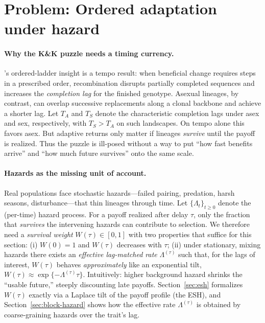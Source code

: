 \documentclass[11pt]{article}
\theoremstyle{upright}
\begin{document}
\section{Problem: Ordered adaptation under hazard}

\paragraph{Why the K\&K puzzle needs a timing currency.}
\citet{Kondrashov2001}'s ordered-ladder insight is a tempo result: when beneficial change requires steps in a prescribed order, recombination disrupts partially completed sequences and increases the \emph{completion lag} for the finished genotype. Asexual lineages, by contrast, can overlap successive replacements along a clonal backbone and achieve a shorter lag. Let $T_A$ and $T_S$ denote the characteristic completion lags under asex and sex, respectively, with $T_S>T_A$ on such landscapes. On tempo alone this favors asex. But adaptive returns only matter if lineages \emph{survive} until the payoff is realized. Thus the puzzle is ill-posed without a way to put “how fast benefits arrive” and “how much future survives” onto the same scale.

\paragraph{Hazards as the missing unit of account.}
Real populations face stochastic hazards—failed pairing, predation, harsh seasons, disturbance—that thin lineages through time. Let $\{\Lambda_t\}_{t\ge 0}$ denote the (per-time) hazard process. For a payoff realized after delay $\tau$, only the fraction that \emph{survives} the intervening hazards can contribute to selection. We therefore need a \emph{survival weight} $W(\tau)\in[0,1]$ with two properties that suffice for this section: (i) $W(0)=1$ and $W(\tau)$ decreases with $\tau$; (ii) under stationary, mixing hazards there exists an \emph{effective lag-matched rate} $\Lambda^{(\tau)}$ such that, for the lags of interest, $W(\tau)$ behaves \emph{approximately} like an exponential tilt, $W(\tau)\approx \exp\!\{-\Lambda^{(\tau)}\tau\}$. Intuitively: higher background hazard shrinks the “usable future,” steeply discounting late payoffs. Section~\ref{sec:esh} formalizes $W(\tau)$ exactly via a Laplace tilt of the payoff profile (the ESH), and Section~\ref{sec:block-hazard} shows how the effective rate $\Lambda^{(\tau)}$ is obtained by coarse-graining hazards over the trait’s lag.
\end{document}

